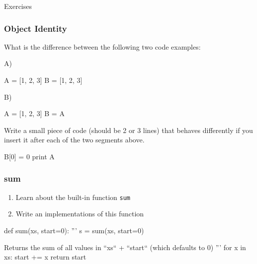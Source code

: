 \begin{frame}
{}

\bigskip
\bigskip
\bigskip
Exercises
\end{frame}

\begin{frame}[fragile]
\frametitle{Object Identity}

What is the difference between the following two code examples:

A)
\begin{python}
A = [1, 2, 3]
B = [1, 2, 3]
\end{python}

B)

\begin{python}
A = [1, 2, 3]
B = A
\end{python}

Write a small piece of code (should be 2 or 3 lines) that behaves differently
if you insert it after each of the two segments above.

\pause

\begin{python}
B[0] = 0
print A
\end{python}

\end{frame}


\begin{frame}[fragile]
\frametitle{sum}
\begin{enumerate}
\item Learn about the built-in function \lstinline{sum}
\item Write an implementations of this function
\end{enumerate}

\pause
\begin{python}
def sum(xs, start=0):
    '''
    s = sum(xs, start=0)

    Returns the sum of all values in ``xs`` + ``start`` (which defaults to 0)
    '''
    for x in xs:
        start += x
    return start
\end{python}
\end{frame}



